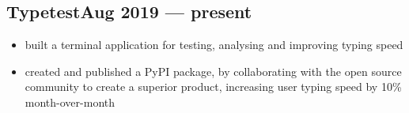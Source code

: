\documentclass{article}
\begin{document}

\subsection{Typetest\hfill Aug 2019 --- present}
\begin{itemize}
  \itemsep0em
  \item built a terminal application for testing, analysing and improving typing speed
  \item created and published a PyPI package, by collaborating with the open source community to create a superior product, increasing user typing speed by 10\% month-over-month
\end{itemize}


\end{document}
